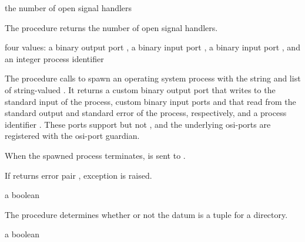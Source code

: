 \begin{procedure}
\end{procedure}
\returns{} the number of open signal handlers

The  procedure returns the number of open
signal handlers.

\begin{procedure}
\end{procedure}
\returns{} four values: a binary output port , a binary
input port , a binary input port ,
and an integer process identifier 

The  procedure calls  to spawn
an operating system process with the string  and list of
string-valued . It returns a custom binary output port
 that writes to the standard input of the process,
custom binary input ports  and  that
read from the standard output and standard error of the process,
respectively, and a process identifier . These ports
support  but not , and
the underlying osi-ports are registered with the osi-port
guardian.

When the spawned process terminates,  is sent to
.

If  returns error pair , exception  is raised.

\begin{procedure}
\end{procedure}
\returns{} a boolean

The  procedure determines whether or not the
datum  is a  tuple for a directory.

\begin{procedure}
\end{procedure}
\returns{} a boolean

